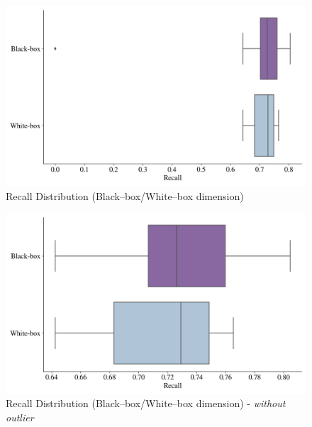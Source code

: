 \begin{figure}[H]
    \centering
    \caption{Recall Distribution (Black--box/White--box dimension)}\vspace{0.5em}
    \label{fig:recdistbbwb}
    \includegraphics[width=140mm]{Figures/RECALL_Distribution_BB_WB.jpg}
    
    \vspace{-1em}
\end{figure}

\begin{figure}[H]
    \centering
    \caption{Recall Distribution (Black--box/White--box dimension) - \textit{without outlier}}\vspace{0.5em}
    \label{fig:recdistwooutbbwb}
    \includegraphics[width=140mm]{Figures/RECALL_WO_OUTLIERS_Distribution_BB_WB.jpg}
    
    \vspace{-1em}
\end{figure}


